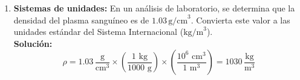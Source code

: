 \documentclass[12pt,letterpaper]{article}
\begin{document}
\begin{enumerate}
    \item \textbf{Sistemas de unidades:} En un análisis de laboratorio, se determina que la densidad del plasma sanguíneo es de $1.03 \, \text{g/cm}^3$. Convierta este valor a las unidades estándar del Sistema Internacional ($\text{kg/m}^3$). \\
    \textbf{Solución:} \\
    \[ \rho = 1.03 \, \frac{\text{g}}{\text{cm}^3} \times \left( \frac{1 \text{ kg}}{1000 \text{ g}} \right) \times \left( \frac{10^6 \text{ cm}^3}{1 \text{ m}^3} \right) = 1030 \, \frac{\text{kg}}{\text{m}^3} \]

\end{enumerate}
\end{document}
